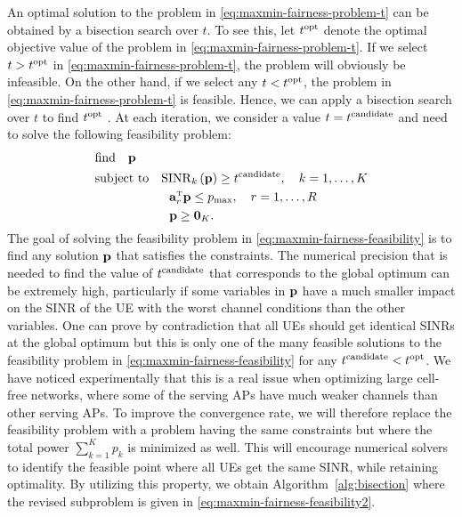 An optimal solution to the problem in \eqref{eq:maxmin-fairness-problem-t} can be obtained by a bisection search over $t$. To see this, let $t^{\rm opt}$ denote the optimal objective value of the problem in \eqref{eq:maxmin-fairness-problem-t}. If we select $t>t^{\rm opt}$ in \eqref{eq:maxmin-fairness-problem-t}, the problem will obviously be infeasible.
On the other hand, if we select any $t<t^{\rm opt}$, the problem in \eqref{eq:maxmin-fairness-problem-t} is feasible. Hence, we can apply a bisection search over $t$ to find $t^{\rm opt}$ \cite[Sec.~4.2.5]{Boyd2004a}.
At each iteration, we consider a value $t=t^{\rm candidate}$ and need to solve the following feasibility problem:
\begin{align} \label{eq:maxmin-fairness-feasibility}
&\textrm{find} \quad \vect{p} \\
&\textrm{subject to} \quad  \mathrm{SINR}_k\left(\vect{p}\right)\geq t^{\rm candidate}, \quad k=1,\ldots,K \nonumber \\
&\hspace{21mm} \vect{a}_r^{\Ttran}\vect{p}\leq p_{\textrm{max}}, \quad r=1,\ldots,R \nonumber \\
&\hspace{21mm} \vect{p} \geq \vect{0}_K \nonumber.
\end{align}
The goal of solving the feasibility problem in \eqref{eq:maxmin-fairness-feasibility} is to find any solution $\mathbf{p}$ that satisfies the constraints. The numerical precision that is needed to find the value of $t^{\rm candidate}$ that corresponds to the global optimum can be extremely high, particularly if some variables in $\mathbf{p}$ have a much smaller impact on the SINR of the UE with the worst channel conditions than the other variables.
One can prove by contradiction that all UEs should get identical SINRs at the global optimum but this is only one of the many feasible solutions to the feasibility problem in \eqref{eq:maxmin-fairness-feasibility} for any $t^{\rm candidate}<t^{\rm opt}$. We have noticed experimentally that this is a real issue when optimizing large cell-free networks, where some of the serving APs have much weaker channels than other serving APs.
To improve the convergence rate, we will therefore replace the feasibility problem with a problem having the same constraints but where the total power $\sum_{k=1}^{K}p_k $ is minimized as well. This will encourage numerical solvers to identify the feasible point where all UEs get the same SINR, while retaining optimality. By utilizing this property, we obtain Algorithm~\ref{alg:bisection} where the revised subproblem is given in \eqref{eq:maxmin-fairness-feasibility2}. 
